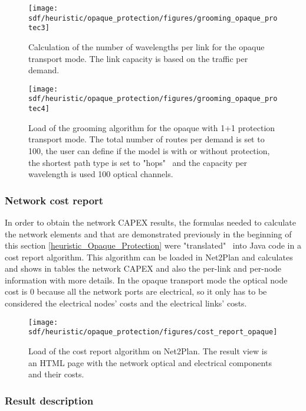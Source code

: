 \begin{figure}[H]
\centering
\texttt{[image: sdf/heuristic/opaque\_protection/figures/grooming\_opaque\_protec3]}
\caption{Calculation of the number of wavelengths per link for the opaque transport mode. The link capacity is based on the traffic per demand.}
\label{grooming_opaque_surv2}
\end{figure}

\begin{figure}[H]
\centering
\texttt{[image: sdf/heuristic/opaque\_protection/figures/grooming\_opaque\_protec4]}
\caption{Load of the grooming algorithm for the opaque with 1+1 protection transport mode. The total number of routes per demand is set to 100, the user can define if the model is with or without protection, the shortest path type is set to "hops" \ and the capacity per wavelength is used 100 optical channels.}
\label{grooming_opaque_surv3}
\end{figure}

\subsubsection{Network cost report}

\vspace{11pt}
In order to obtain the network CAPEX results, the formulas needed to calculate the network elements and that are demonstrated previously in the beginning of this section \ref{heuristic_Opaque_Protection} were "translated" \ into Java code in a cost report algorithm. This algorithm can be loaded in Net2Plan and calculates and shows in tables the network CAPEX and also the per-link and per-node information with more details.
In the opaque transport mode the optical node cost is 0 because all the network ports are electrical, so it only has to be considered the electrical nodes' costs and the electrical links' costs.

\begin{figure}[H]
\centering
\texttt{[image: sdf/heuristic/opaque\_protection/figures/cost\_report\_opaque]}
\caption{Load of the cost report algorithm on Net2Plan. The result view is an HTML page with the network optical and electrical components and their costs.}
\label{cost_report_opaque}
\end{figure}

\subsubsection{Result description}\label{result_description_opaque_heuristic_protec}


